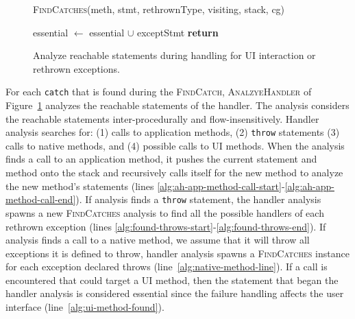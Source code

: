 \begin{figure}[t]
\begin{algorithmic}[1]
\EndFor \label{alg:calc-rethrow-types-end}

\label{alg:findcatches-rethrown-line}
\State \textsc{FindCatches}(meth, stmt, rethrownType, visiting, stack,
cg)

\label{alg:progagate-line}
\State essential $\gets$ essential $\cup$ exceptStmt
\State \textbf{return}
\EndIf
\EndFor
\label{alg:found-throws-end}
\EndIf

\EndFor

\EndProcedure
\end{algorithmic}
\caption{Analyze reachable statements during handling for UI
  interaction or rethrown exceptions.}\label{alg:analyzehandler}
\vspace{-0.05in}
\end{figure}

For each \lstinline!catch! that is found during the
\textsc{FindCatch}, \textsc{AnalzyeHandler} of
Figure~\ref{alg:analyzehandler} analyzes the reachable statements of
the handler. The analysis considers the reachable statements
inter-procedurally and flow-insens\-itively.  Handler analysis
searches for: (1) calls to application methods, (2) \lstinline!throw!
statements (3) calls to native methods, and (4) possible calls to UI
methods. When the analysis finds a call to an application method, it
pushes the current statement and method onto the stack and recursively
calls itself for the new method to analyze the new method's statements
(lines
\ref{alg:ah-app-method-call-start}-\ref{alg:ah-app-method-call-end}).
If analysis finds a \lstinline!throw!  statement, the handler analysis
spawns a new \textsc{FindCatches} analysis to find all the possible
handlers of each rethrown exception (lines
\ref{alg:found-throws-start}-\ref{alg:found-throws-end}).  If analysis
finds a call to a native method, we assume that it will throw all
exceptions it is defined to throw, handler analysis spawns a
\textsc{FindCatches} instance for each exception declared throws
(line~\ref{alg:native-method-line}).  If a call is encountered that
could target a UI method, then the statement that began the handler
analysis is considered essential since the failure handling affects
the user interface (line~\ref{alg:ui-method-found}).



